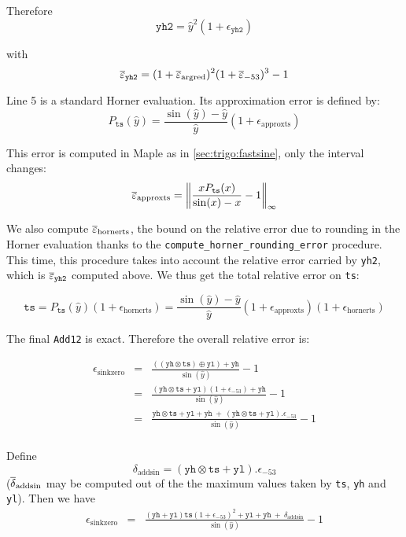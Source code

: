 Therefore
\begin{equation}
  \mathtt{yh2}=\hat{y}^2(1+\epsilon_{\mathtt{yh2}})
\end{equation}

with
\begin{equation}
  {\overline{\varepsilon}}_{\mathtt{yh2}} = (1+{\overline{\varepsilon}}_{\mathrm{argred}})^2(1+{\overline{\varepsilon}}_{-53})^3 - 1
\end{equation}

Line 5 is a standard Horner evaluation. Its approximation error is defined by: 
$$
P_{\mathtt{ts}}(\hat{y}) = \frac{\sin(\hat{y})-\hat{y}}{\hat{y}}(1+\epsilon_{\mathrm{approxts}})
$$

This error is computed in Maple as in \ref{sec:trigo:fastsine}, only the interval changes:
$${\overline{\varepsilon}}_{\mathrm{approxts}} = \left\Vert \frac{xP_{\mathtt{ts}}(x)}{\sin(x)-x} -1 \right\Vert_{\infty}$$

We also compute ${\overline{\varepsilon}}_{\mathrm{hornerts}}$, the bound on the relative error due
to rounding in the Horner evaluation thanks to the
\texttt{compute\_horner\_rounding\_error} procedure. This time, this procedure 
takes into account the relative error carried by \texttt{yh2}, which is
${\overline{\varepsilon}}_{\mathtt{yh2}}$ computed above.
We thus get the total relative error on \texttt{ts}:

\begin{equation}
  \mathtt{ts} = P_{\mathtt{ts}}(\hat{y})(1+\epsilon_{\mathrm{hornerts}}) = \frac{\sin(\hat{y})-\hat{y}}{\hat{y}}(1+\epsilon_{\mathrm{approxts}})(1+\epsilon_{\mathrm{hornerts}})
  \label{eq:sink0ts}
\end{equation}

The final \texttt{Add12} is exact. Therefore the overall relative error is:

\begin{eqnarray*}
  \epsilon_{\mathrm{sinkzero}} 
  &=& \frac{((\mathtt{yh}\otimes \mathtt{ts}) \oplus \mathtt{yl}) + \mathtt{yh}}{\sin(\hat{y})} -1 \\
  &=& \frac{(\mathtt{yh}\otimes\mathtt{ts} + \mathtt{yl})(1+\epsilon_{-53}) + \mathtt{yh}}{\sin(\hat{y})} -1\\
  &=& \frac{\mathtt{yh}\otimes\mathtt{ts} + \mathtt{yl} + \mathtt{yh}    \ +\  (\mathtt{yh}\otimes\mathtt{ts} + \mathtt{yl}).\epsilon_{-53}}{\sin(\hat{y})} -1\\
\end{eqnarray*}

Define 
\begin{equation}
  \delta_{\mathrm{addsin}} = (\mathtt{yh}\otimes\mathtt{ts} + \mathtt{yl}).\epsilon_{-53}
\label{eq:addsin}
\end{equation}
(${\overline{\delta}}_{\mathrm{addsin}}$ may be computed out of the the maximum
values taken by \texttt{ts}, \texttt{yh} and \texttt{yl}). Then we have
\begin{eqnarray*}
  \epsilon_{\mathrm{sinkzero}} 
  &=& \frac{(\mathtt{yh} + \mathtt{yl})\mathtt{ts}(1+\epsilon_{-53})^2 + \mathtt{yl} + \mathtt{yh}    \ +\  \delta_{\mathrm{addsin}} }{\sin(\hat{y})} -1\\
\end{eqnarray*}

